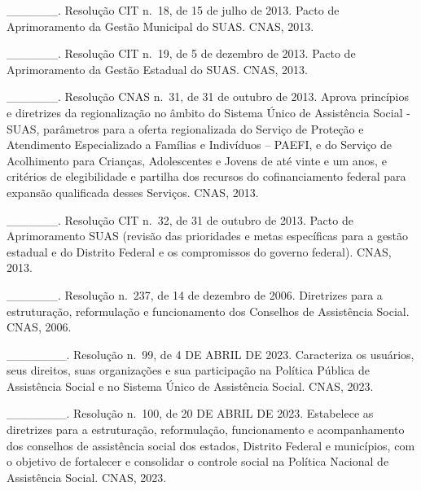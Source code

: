 \documentclass[
  brazilian]{report}
\begin{document}
\_\_\_\_\_\_. Resolução CIT n.~18, de 15 de julho de 2013. Pacto de
Aprimoramento da Gestão Municipal do SUAS. CNAS, 2013.

\_\_\_\_\_\_. Resolução CIT n.~19, de 5 de dezembro de 2013. Pacto de
Aprimoramento da Gestão Estadual do SUAS. CNAS, 2013.

\_\_\_\_\_\_. Resolução CNAS n.~31, de 31 de outubro de 2013. Aprova
princípios e diretrizes da regionalização no âmbito do Sistema Único de
Assistência Social - SUAS, parâmetros para a oferta regionalizada do
Serviço de Proteção e Atendimento Especializado a Famílias e Indivíduos
-- PAEFI, e do Serviço de Acolhimento para Crianças, Adolescentes e
Jovens de até vinte e um anos, e critérios de elegibilidade e partilha
dos recursos do cofinanciamento federal para expansão qualificada desses
Serviços. CNAS, 2013.

\_\_\_\_\_\_. Resolução CIT n.~32, de 31 de outubro de 2013. Pacto de
Aprimoramento SUAS (revisão das prioridades e metas específicas para a
gestão estadual e do Distrito Federal e os compromissos do governo
federal). CNAS, 2013.

\_\_\_\_\_\_. Resolução n.~237, de 14 de dezembro de 2006. Diretrizes
para a estruturação, reformulação e funcionamento dos Conselhos de
Assistência Social. CNAS, 2006.

\_\_\_\_\_\_\_. Resolução n.~99, de 4 DE ABRIL DE 2023. Caracteriza os
usuários, seus direitos, suas organizações e sua participação na
Política Pública de Assistência Social e no Sistema Único de Assistência
Social. CNAS, 2023.

\_\_\_\_\_\_\_. Resolução n.~100, de 20 DE ABRIL DE 2023. Estabelece as
diretrizes para a estruturação, reformulação, funcionamento e
acompanhamento dos conselhos de assistência social dos estados, Distrito
Federal e municípios, com o objetivo de fortalecer e consolidar o
controle social na Política Nacional de Assistência Social. CNAS, 2023.
\end{document}
